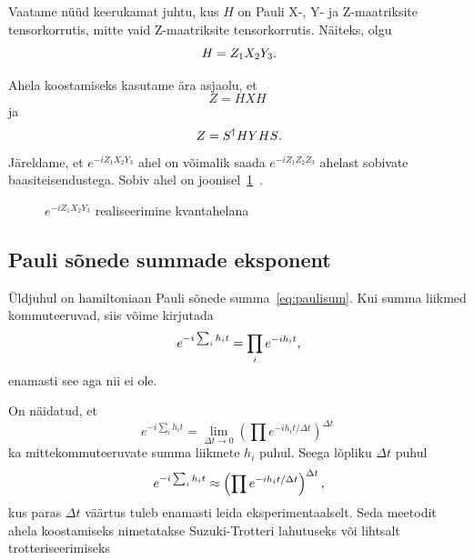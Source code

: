 \documentclass[12pt]{report}
\def\paren#1{\left(#1\right)}
\begin{document}
Vaatame nüüd keerukamat juhtu, kus \(H\) on Pauli X-, Y- ja Z-maatriksite tensorkorrutis, mitte vaid Z-maatriksite tensorkorrutis.
Näiteks, olgu
\begin{equation}
  H=Z_1X_2Y_3\rlap{.}
\end{equation}

Ahela koostamiseks kasutame ära asjaolu, et
\begin{equation} Z=HXH \end{equation}
ja
\begin{equation} Z=S^{\dagger}HYHS\rlap{.} \end{equation}
Järeldame, et \(e^{-iZ_1X_2Y_3}\) ahel on võimalik saada \(e^{-iZ_1Z_2Z_3}\) ahelast sobivate baasiteisendustega.
Sobiv ahel on joonisel~\ref{f:zxyex}~\cite{nielsen+chuang}.

\begin{figure}[h]
  \centering
  \caption{\(e^{-iZ_1X_2Y_3}\) realiseerimine kvantahelana}
  \label{f:zxyex}
\end{figure}


\subsection{Pauli sõnede summade eksponent}

Üldjuhul on hamiltoniaan Pauli sõnede summa~\ref{eq:paulisum}.
Kui summa liikmed kommuteeruvad, siis võime kirjutada
\begin{equation}
  e^{-i\sum_i h_it}=\prod_ie^{-ih_it}\rlap{,}
\end{equation}
enamasti see aga nii ei ole.

On näidatud, et
\begin{equation}
  e^{-i\sum_i h_it}=\lim_{\Delta t\rightarrow0}\paren{\prod e^{-ih_i t/\Delta t}}^{\Delta t}
\end{equation}
ka mittekommuteeruvate summa liikmete $h_i$ puhul.
Seega lõpliku $\Delta t$ puhul
\begin{equation}
  e^{-i\sum_i h_it}\approx\paren{\prod e^{-ih_i t/\Delta t}}^{\Delta t}\rlap{,}
\end{equation}
kus paras $\Delta t$ väärtus tuleb enamasti leida eksperimentaalselt.
Seda meetodit ahela koostamiseks nimetatakse Suzuki-Trotteri lahutuseks või lihtsalt trotteriseerimiseks~\cite{mansky+etal}
\end{document}
